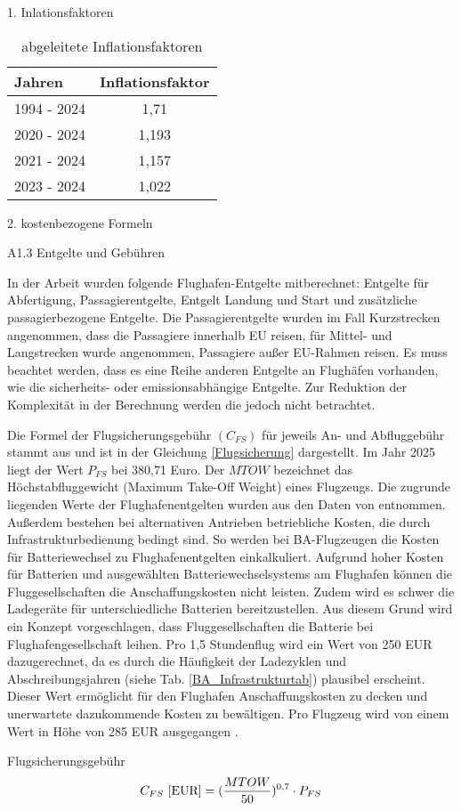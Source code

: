 1. Inlationsfaktoren
\begin{table}[h]
	\begin{center}
    \caption{abgeleitete Inflationsfaktoren}
	\label{Inflationsfaktoren}
	\begin{tabular}{|l|c|}
		\hline
		Jahren & \textbf{Inflationsfaktor} \\ \hline
		1994 - 2024 & 1,71 \\ \hline
		2020 - 2024 & 1,193 \\ \hline
        2021 - 2024 & 1,157 \\ \hline
        2023 - 2024 & 1,022 \\ \hline
	\end{tabular}
    \end{center}
\end{table}

2. kostenbezogene Formeln


A1.3 Entgelte und Gebühren

In der Arbeit wurden folgende Flughafen-Entgelte mitberechnet: Entgelte für Abfertigung, Passagierentgelte, Entgelt Landung und Start
und zusätzliche passagierbezogene Entgelte. Die Passagierentgelte wurden im Fall Kurzstrecken angenommen,
dass die Passagiere innerhalb EU reisen, für Mittel- und Langstrecken wurde angenommen, Passagiere außer EU-Rahmen reisen.
Es muss beachtet werden, dass es eine Reihe anderen Entgelte an Flughäfen vorhanden, 
wie die sicherheits- oder emissionsabhängige Entgelte. Zur Reduktion der Komplexität in der Berechnung werden die jedoch nicht betrachtet.

Die Formel der Flugsicherungsgebühr $(C_{FS})$ für jeweils An- und Abfluggebühr stammt aus \cite{dfs_flugsicherungsgebuehren} und ist in der Gleichung \eqref{Flugsicherung}
dargestellt. Im Jahr 2025 liegt der Wert $P_{FS}$ bei 380,71 Euro. 
Der $MTOW$ bezeichnet das Höchstabfluggewicht (Maximum Take-Off Weight) eines Flugzeugs. 
Die zugrunde liegenden Werte der Flughafenentgelten wurden aus den Daten von \cite{fraport2025entgelte} entnommen.
Außerdem bestehen bei alternativen Antrieben betriebliche Kosten, die durch Infrastrukturbedienung bedingt sind.
So werden bei BA-Flugzeugen die Kosten für Batteriewechsel zu Flughafenentgelten einkalkuliert. Aufgrund hoher Kosten für Batterien
und ausgewählten Batteriewechselsystems am Flughafen können die Fluggesellschaften die Anschaffungskosten nicht leisten. 
Zudem wird es schwer die Ladegeräte für unterschiedliche 
Batterien bereitzustellen. Aus diesem Grund wird ein Konzept vorgeschlagen, dass
Fluggesellschaften die Batterie bei Flughafengesellschaft leihen. Pro 1,5 Stundenflug wird ein Wert von 250 EUR dazugerechnet, da es durch
die Häufigkeit der Ladezyklen und Abschreibungsjahren (siehe Tab. \ref{BA_Infrastrukturtab}) plausibel erscheint.
Dieser Wert ermöglicht für den Flughafen Anschaffungskosten zu decken und unerwartete dazukommende Kosten zu bewältigen.
Pro Flugzeug wird von einem Wert in Höhe von 285 EUR ausgegangen \cite{guo2023infrastructure}.

Flugsicherungsgebühr
\begin{equation}
	{C_{FS} ~[\text{EUR}]} = (\frac{MTOW}{50})^{0,7} \cdot P_{FS} \\
	\label{Flugsicherung}
 \end{equation}
 